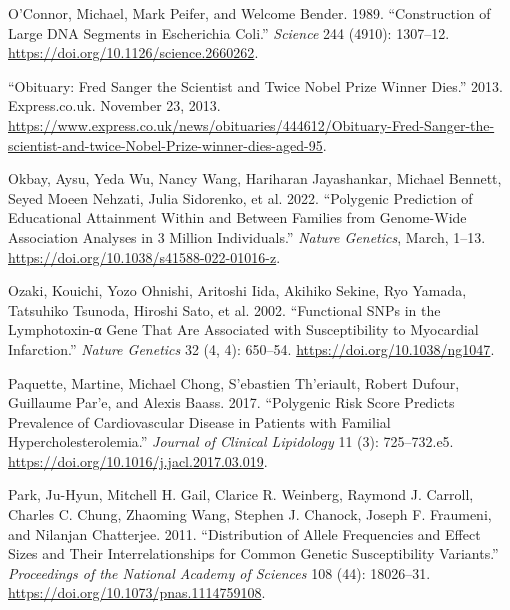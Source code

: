 \documentclass[
]{book}
\newlength{\cslhangindent}
\newlength{\cslentryspacingunit} %
\newenvironment{CSLReferences}[2] %
 {%
  \setlength{\parindent}{0pt}
  \ifodd #1
  \let\oldpar\par
  \def\par{\hangindent=\cslhangindent\oldpar}
  \fi
  \setlength{\parskip}{#2\cslentryspacingunit}
 }%
 {}
\begin{document}
\begin{CSLReferences}{1}{0}
\leavevmode{}%
O'Connor, Michael, Mark Peifer, and Welcome Bender. 1989. {``Construction of {Large DNA Segments} in {Escherichia} Coli.''} \emph{Science} 244 (4910): 1307--12. \url{https://doi.org/10.1126/science.2660262}.

\leavevmode{}%
{``Obituary: {Fred Sanger} the Scientist and Twice {Nobel Prize} Winner Dies.''} 2013. {Express.co.uk}. November 23, 2013. \url{https://www.express.co.uk/news/obituaries/444612/Obituary-Fred-Sanger-the-scientist-and-twice-Nobel-Prize-winner-dies-aged-95}.

\leavevmode{}%
Okbay, Aysu, Yeda Wu, Nancy Wang, Hariharan Jayashankar, Michael Bennett, Seyed Moeen Nehzati, Julia Sidorenko, et al. 2022. {``Polygenic Prediction of Educational Attainment Within and Between Families from Genome-Wide Association Analyses in 3 Million Individuals.''} \emph{Nature Genetics}, March, 1--13. \url{https://doi.org/10.1038/s41588-022-01016-z}.

\leavevmode{}%
Ozaki, Kouichi, Yozo Ohnishi, Aritoshi Iida, Akihiko Sekine, Ryo Yamada, Tatsuhiko Tsunoda, Hiroshi Sato, et al. 2002. {``Functional {SNPs} in the Lymphotoxin-α Gene That Are Associated with Susceptibility to Myocardial Infarction.''} \emph{Nature Genetics} 32 (4, 4): 650--54. \url{https://doi.org/10.1038/ng1047}.

\leavevmode{}%
Paquette, Martine, Michael Chong, S'ebastien Th'eriault, Robert Dufour, Guillaume Par'e, and Alexis Baass. 2017. {``Polygenic Risk Score Predicts Prevalence of Cardiovascular Disease in Patients with Familial Hypercholesterolemia.''} \emph{Journal of Clinical Lipidology} 11 (3): 725--732.e5. \url{https://doi.org/10.1016/j.jacl.2017.03.019}.

\leavevmode{}%
Park, Ju-Hyun, Mitchell H. Gail, Clarice R. Weinberg, Raymond J. Carroll, Charles C. Chung, Zhaoming Wang, Stephen J. Chanock, Joseph F. Fraumeni, and Nilanjan Chatterjee. 2011. {``Distribution of Allele Frequencies and Effect Sizes and Their Interrelationships for Common Genetic Susceptibility Variants.''} \emph{Proceedings of the National Academy of Sciences} 108 (44): 18026--31. \url{https://doi.org/10.1073/pnas.1114759108}.


\end{CSLReferences}
\end{document}
